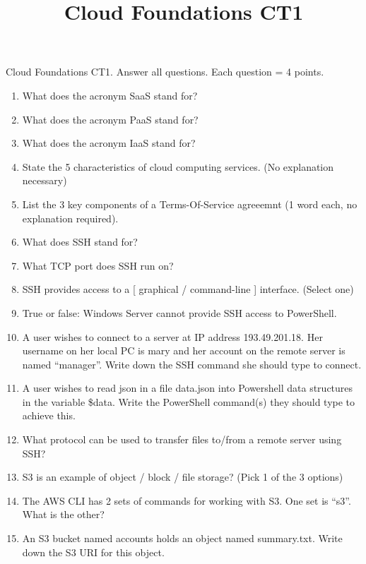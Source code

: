 \documentclass{pgnotes}
\title{Cloud Foundations CT1}
\begin{document}
Cloud Foundations CT1. Answer all questions. Each question = 4 points.

\begin{enumerate}

\item What does the acronym SaaS stand for?
  
\item What does the acronym PaaS stand for?
  
\item What does the acronym IaaS stand for?

\item State the 5 characteristics of cloud computing services. (No explanation necessary)
  
\item List the 3 key components of a Terms-Of-Service agreeemnt (1 word each, no explanation required). 

\item What does SSH stand for?
  
\item What TCP port does SSH run on?

\item SSH provides access to a [ graphical / command-line ] interface. (Select one)
  
\item True or false: Windows Server cannot provide SSH access to PowerShell.
  
\item A user wishes to connect to a server at IP address 193.49.201.18. Her username on her local PC is mary and her account on the remote server is named ``manager''. Write down the SSH command she should type to connect.

\item A user wishes to read json in a file data.json into Powershell data structures in the variable \$data. Write the PowerShell command(s) they should type to achieve this.

\item What protocol can be used to transfer files to/from a remote server using SSH? 

\item S3 is an example of object / block / file storage? (Pick 1 of the 3 options)

\item The AWS CLI has 2 sets of commands for working with S3. One set is ``s3''. What is the other?
  
\item An S3 bucket named accounts holds an object named summary.txt. Write down the S3 URI for this object.


\end{enumerate}
\end{document}
